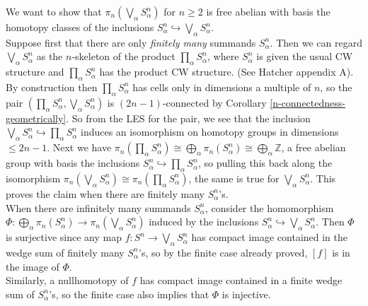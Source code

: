 \begin{example}
    We want to show that
    $\pi_n \left( \bigvee_{\alpha}S_{\alpha}^{n} \right) $ 
    for $n\ge 2$ is free abelian with basis
    the homotopy classes of the inclusions
    $S_{\alpha}^{n} \hookrightarrow 
    \bigvee_{\alpha} S_{\alpha}^{n}$.\\
    Suppose first that there are only \textit{finitely many}
    summands $S_{\alpha}^{n}$. Then we can regard
    $\bigvee_{\alpha} S_{\alpha}^{n}$ as
    the $n$-skeleton of the product
    $\prod_{\alpha} S_{\alpha}^{n}$, where
    $S_{\alpha}^{n}$ is given the usual CW structure
    and $\prod_{\alpha} S_{\alpha}^{n}$ has the product
    CW structure. (See Hatcher appendix A).\\
    By construction then $\prod_{\alpha} S_{\alpha}^{n}$ 
    has cells only in dimensions a multiple of $n$, so
    the pair $\left( \prod_{\alpha} S_{\alpha}^{n},
    \bigvee_{\alpha} S_{\alpha}^{n} \right) $ is
    $(2n-1)$-connected by Corollary 
    \ref{n-connectedness-geometrically}.
    So from the LES for the pair, we see that
    the inclusion
    $\bigvee_{\alpha} S_{\alpha}^{n}
    \hookrightarrow \prod_{\alpha} S_{\alpha}^{n}$
    induces an isomorphism on homotopy groups
    in dimensions $\le 2n-1$. Next we have
    $\pi_n \left( \prod_{\alpha} S_{\alpha}^{n} \right) 
    \cong \bigoplus_{\alpha} \pi_n \left( S_{\alpha}^{n} \right) 
    \cong \bigoplus_{\alpha} \mathbb{Z}$,
    a free abelian group with basis the inclusions
    $S_{\alpha}^{n} \hookrightarrow \prod_{\alpha}
    S_{\alpha}^{n}$, so pulling this back along the
    isomorphism
    $\pi_{n}\left( \bigvee_{\alpha}S_{\alpha}^{n} \right) 
    \cong \pi_n \left( \prod_{\alpha}S_{\alpha}^{n} \right) $,
    the same is true for $\bigvee_{\alpha}S_{\alpha}^{n}$.
    This proves the claim when there are
    finitely many $S_{\alpha}^{n}$'s.\\
    When there are infinitely many summands
    $S_{\alpha}^{n}$, consider the homomorphism
    $\Phi \colon \bigoplus_{\alpha}
    \pi_n \left( S_{\alpha}^{n} \right) \to 
    \pi_n \left( \bigvee_{\alpha}S_{\alpha}^{n} \right) $ 
    induced by the inclusions
    $S_{\alpha}^{n} \hookrightarrow \bigvee_{\alpha}
    S_{\alpha}^{n}$. Then $\Phi$ is surjective
    since any map $f \colon S^{n} \to 
    \bigvee_{\alpha}S_{\alpha}^{n}$ has compact
    image contained in the wedge sum of finitely many
    $S_{\alpha}^{n}$'s, so by the finite case already proved,
    $\left[ f \right] $ is in the image of $\Phi$.\\
    Similarly, a nullhomotopy of $f$ has compact image
    contained in a finite wedge sum of $S_{\alpha}^{n}$'s,
    so the finite case also implies that $\Phi$ is injective.
\end{example}

